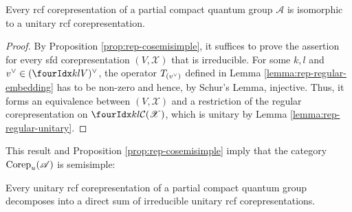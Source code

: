 \begin{Prop} \label{prop:rep-unitarisable} Every  rcf
  corepresentation of a partial compact quantum group $\mathscr{A}$ is
  isomorphic to a unitary rcf corepresentation.
\end{Prop}
\begin{proof}
  By Proposition \ref{prop:rep-cosemisimple}, it suffices to prove the
  assertion for every sfd corepresentation $(V,\mathscr{X})$ that is
  irreducible.  For some $k,l$ and $\dual{v} \in
  \dual{(\Gru{V}{k}{l})}$, the operator $T_{(v^{\vee})}$ defined in
  Lemma \ref{lemma:rep-regular-embedding} has to be non-zero and
  hence, by Schur's Lemma, injective. Thus, it forms an equivalence
  between $(V,\mathscr{X})$ and a restriction of the regular
  corepresentation on $\Gru{\mathcal{C}(\mathscr{X})}{k}{l}$, which is
  unitary by Lemma \ref{lemma:rep-regular-unitary}.
\end{proof}
This result and Proposition \ref{prop:rep-cosemisimple}
imply that the category $\mathrm{Corep}_{u}(\mathscr{A})$ is semisimple:
\begin{Cor}
  Every unitary rcf corepresentation of a partial compact quantum
  group decomposes into a direct sum of irreducible unitary rcf
  corepresentations.
\end{Cor}
 
